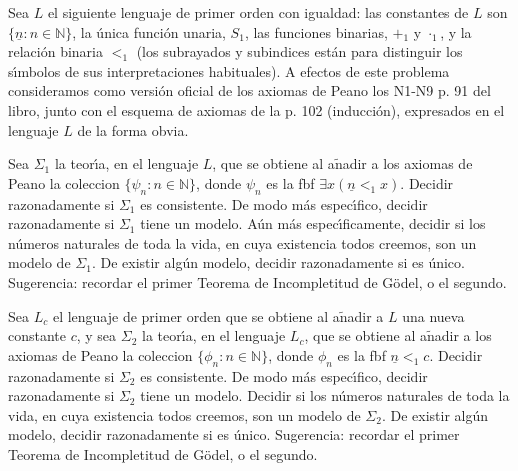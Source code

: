 \begin{problem}
Sea  $L$  el siguiente lenguaje de primer orden  con igualdad: las constantes de $L$ son
$\{\underline{n}: n\in\mathbb{N}\}$, la \'unica funci\'on unaria, $S_1$, las funciones binarias,
$+_1$ y $\cdot_1$, y la relaci\'on binaria $<_1$ (los subrayados y subindices est\'an para
distinguir los s\'{\i}mbolos de sus interpretaciones habituales). A efectos de este problema
consideramos como versi\'on oficial de los axiomas de Peano los N1-N9 p. 91 del libro, junto con el esquema
de axiomas de la p. 102 (inducci\'on), expresados en el lenguaje $L$ de la forma
obvia.

\ppart Sea $\Sigma_1$ la teor\'{\i}a,
 en el lenguaje $L$, que se obtiene al a$\operatorname{\tilde{n}}$adir a los
axiomas de Peano la coleccion $\{ \psi_n: n\in\mathbb{N}\}$, donde
$\psi_n$ es la fbf $\exists x (\underline{n} <_1 x )$.
 Decidir razonadamente si
$\Sigma_1$ es consistente. De modo m\'as espec\'{\i}fico, decidir razonadamente si $\Sigma_1$ tiene un modelo.  A\'un m\'as espec\'{\i}ficamente, decidir si los n\'umeros naturales
de toda la vida, en cuya existencia todos creemos,  son un modelo de $\Sigma_1$.
De existir alg\'un modelo, decidir razonadamente si es \'unico.
Sugerencia: recordar el primer Teorema de Incompletitud de G\"odel, o el segundo.

\ppart Sea $L_c$ el lenguaje de primer orden que se obtiene al a$\operatorname{\tilde{n}}$adir
a $L$ una nueva constante $c$, y sea
$\Sigma_2$ la teor\'{\i}a,
 en el lenguaje $L_c$, que se obtiene al a$\operatorname{\tilde{n}}$adir a los
axiomas de Peano la coleccion $\{ \phi_n: n\in\mathbb{N}\}$, donde
$\phi_n$ es la fbf $\underline{n} <_1 c$.
Decidir razonadamente si
$\Sigma_2$ es consistente. De modo m\'as espec\'{\i}fico, decidir razonadamente si $\Sigma_2$ tiene un modelo.  Decidir si los n\'umeros naturales
de toda la vida, en cuya existencia todos creemos,  son un modelo de $\Sigma_2$.
De existir alg\'un modelo, decidir razonadamente si es \'unico.
Sugerencia: recordar el primer Teorema de Incompletitud de G\"odel, o el segundo.
\solution
\end{problem}
